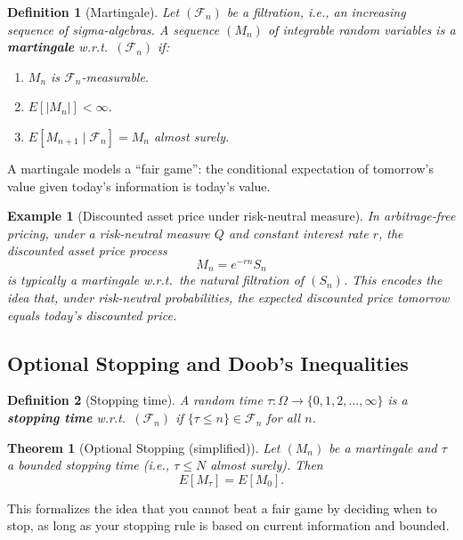 \documentclass[11pt,a4paper]{article}
\newtheorem{definition}{Definition}[section]
\newtheorem{theorem}{Theorem}[section]
\newtheorem{example}{Example}[section]
\numberwithin{equation}{section}
\begin{document}
\begin{definition}[Martingale]
Let $(\mathcal{F}_n)$ be a filtration, i.e., an increasing sequence of sigma-algebras. 
A sequence $(M_n)$ of integrable random variables is a \textbf{martingale} w.r.t.\ $(\mathcal{F}_n)$ if:
\begin{enumerate}[label=(\roman*)]
    \item $M_n$ is $\mathcal{F}_n$-measurable.
    \item $E[|M_n|]<\infty$.
    \item $E[M_{n+1} \mid \mathcal{F}_n] = M_n$ almost surely.
\end{enumerate}
\end{definition}

A martingale models a ``fair game'': the conditional expectation of tomorrow's value given today's information is today's value.

\begin{example}[Discounted asset price under risk-neutral measure]
In arbitrage-free pricing, under a risk-neutral measure $Q$ and constant interest rate $r$, the discounted asset price process
\[
M_n = e^{-rn} S_n
\]
is typically a martingale w.r.t.\ the natural filtration of $(S_n)$. 
This encodes the idea that, under risk-neutral probabilities, the expected discounted price tomorrow equals today's discounted price.

\end{example}

\subsection{Optional Stopping and Doob's Inequalities}

\begin{definition}[Stopping time]
A random time $\tau:\Omega\to\{0,1,2,\dots,\infty\}$ is a \textbf{stopping time} w.r.t.\ $(\mathcal{F}_n)$ if $\{\tau \le n\}\in \mathcal{F}_n$ for all $n$.
\end{definition}

\begin{theorem}[Optional Stopping (simplified)]
Let $(M_n)$ be a martingale and $\tau$ a bounded stopping time (i.e., $\tau \le N$ almost surely). 
Then
\[
E[M_\tau] = E[M_0].
\]
\end{theorem}

This formalizes the idea that you cannot beat a fair game by deciding when to stop, as long as your stopping rule is based on current information and bounded.
\end{document}
